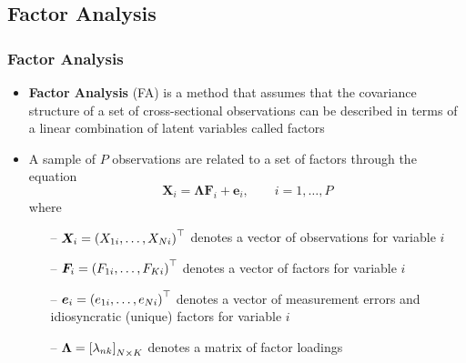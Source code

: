 \documentclass[10pt, compress, notheorems, aspectratio=169]{beamer}
\let\originalleft\left
\let\originalright\right
\renewcommand{\left}{\mathopen{}\mathclose \bgroup \originalleft}
\renewcommand{\right}{\aftergroup \egroup \originalright}
\begin{document}
\subsection{Factor Analysis}

\begin{frame}
	\frametitle{Factor Analysis}
	\begin{itemize}
		\item \textbf{Factor Analysis} (FA) is a method that assumes that the covariance structure of a set of cross-sectional observations can be described in terms of a linear combination of latent variables called factors
		\item A sample of $P$ observations are related to a set of factors through the equation
			\begin{equation}
				{\bm X}_i = {\bm \Lambda} {\bm F}_i + {\bm e}_i, \qquad i = 1, \ldots, P
			\end{equation}
			where 
			\begin{itemize}
				\item[--] ${\bm X}_i = \left(X_{1i}, \ldots, X_{Ni} \right)^{\top}$ denotes a vector of observations for variable $i$
				\item[--] ${\bm F}_i = \left(F_{1i}, \ldots, F_{Ki} \right)^{\top}$ denotes a vector of factors for variable $i$
				\item[--] ${\bm e}_i = \left(e_{1i}, \ldots, e_{Ni} \right)^{\top}$ denotes a vector of measurement errors and idiosyncratic (unique) factors for variable $i$
				\item[--] ${\bm \Lambda} = \left[ \lambda_{nk} \right]_{N \times K}$ denotes a matrix of factor loadings
			\end{itemize}
	\end{itemize}
\end{frame}
\end{document}
